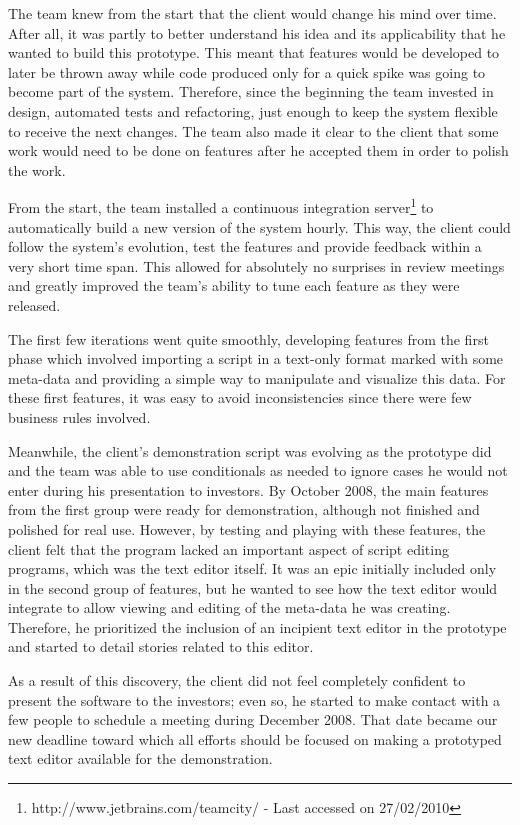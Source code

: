 \documentclass[lnbip]{svmultln}
\begin{document}
The team knew from the start that the client would change his mind
over time. After all, it was partly to better understand his idea and
its applicability that he wanted to build this prototype. This meant
that features would be developed to later be thrown away while code
produced only for a quick spike was going to become part of the
system. Therefore, since the beginning the team invested in design,
automated tests and refactoring, just enough to keep the system
flexible to receive the next changes. The team also made it clear to
the client that some work would need to be done on features after he
accepted them in order to polish the work.

From the start, the team installed a continuous integration
server\footnote{http://www.jetbrains.com/teamcity/ - Last accessed on
  27/02/2010} to automatically build a new version of the system
hourly. This way, the client could follow the system's evolution, test
the features and provide feedback within a very short time span. This
allowed for absolutely no surprises in review meetings and greatly
improved the team's ability to tune each feature as they were
released.

The first few iterations went quite smoothly, developing features from
the first phase which involved importing a script in a text-only
format marked with some meta-data and providing a simple way to
manipulate and visualize this data. For these first features, it was
easy to avoid inconsistencies since there were few business rules
involved.

Meanwhile, the client's demonstration script was evolving as the
prototype did and the team was able to use conditionals as needed to
ignore cases he would not enter during his presentation to
investors. By October 2008, the main features from the first group
were ready for demonstration, although not finished and polished for
real use. However, by testing and playing with these features, the
client felt that the program lacked an important aspect of script
editing programs, which was the text editor itself. It was an epic
initially included only in the second group of features, but he wanted
to see how the text editor would integrate to allow viewing and
editing of the meta-data he was creating. Therefore, he prioritized
the inclusion of an incipient text editor in the prototype and started
to detail stories related to this editor.

As a result of this discovery, the client did not feel completely
confident to present the software to the investors; even so, he
started to make contact with a few people to schedule a meeting during
December 2008. That date became our new deadline toward which all
efforts should be focused on making a prototyped text editor available
for the demonstration.
\end{document}
